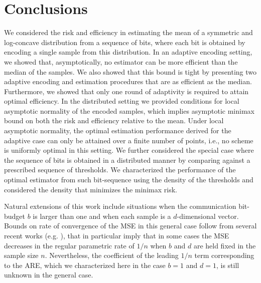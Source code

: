 \section{Conclusions \label{sec:conclusions}}
We considered the risk and efficiency in estimating the mean of a symmetric and log-concave distribution from a sequence of bits, where each bit is obtained by encoding a single sample from this distribution. 
%
In an adaptive encoding setting, we showed that, asymptotically, no estimator can be more efficient than the median of the samples. We also showed that this bound is tight by presenting two adaptive encoding and estimation procedures that are as efficient as the median. Furthermore, we showed that only one round of adaptivity is required to attain optimal efficiency. In the distributed setting we provided conditions for local asymptotic normality of the encoded samples, which implies asymptotic minimax bound on both the risk and efficiency relative to the mean. 
%
Under local asymptotic normality, the optimal estimation performance derived for the adaptive case can only be attained over a finite number of points, i.e., no scheme is uniformly optimal in this setting. 
%
We further considered the special case where the sequence of bits is obtained in a distributed manner by comparing against a prescribed sequence of thresholds. We characterized the performance of the optimal estimator from such bit-sequence using the density of the thresholds and considered the density that minimizes the minimax risk. 
%

Natural extensions of this work include situations when the communication bit-budget $b$ is larger than one and when each sample is a $d$-dimensional vector. Bounds on rate of convergence of the MSE in this general case follow from several recent works (e.g. \cite{zhang2013information,shamir2014fundamental,
braverman2016communication,han2018geometric,
barnes2020lower,cai2020distributed}), that in particular imply that in some cases the MSE decreases in the regular parametric rate of $1/n$ when $b$ and $d$ are held fixed in the sample size $n$. Nevertheless, the coefficient of the leading $1/n$ term corresponding to the ARE, which we characterized here in the case $b=1$ and $d=1$, is still unknown in the general case.
